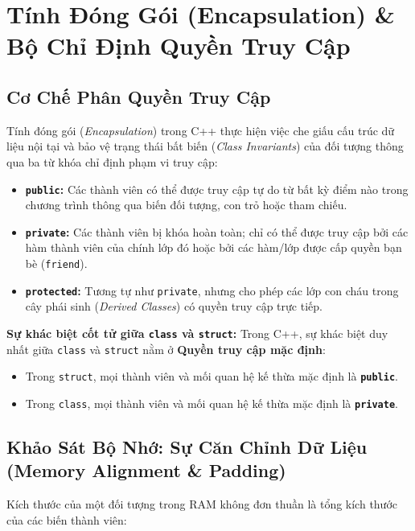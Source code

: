 \documentclass[12pt,a4paper,oneside]{book}
\begin{document}
\section{Tính Đóng Gói (Encapsulation) \& Bộ Chỉ Định Quyền Truy Cập}

\subsection{Cơ Chế Phân Quyền Truy Cập}

Tính đóng gói (\textit{Encapsulation}) trong C++ thực hiện việc che giấu cấu trúc dữ liệu nội tại và bảo vệ trạng thái bất biến (\textit{Class Invariants}) của đối tượng thông qua ba từ khóa chỉ định phạm vi truy cập:

\begin{itemize}
    \item \textbf{\texttt{public}:} Các thành viên có thể được truy cập tự do từ bất kỳ điểm nào trong chương trình thông qua biến đối tượng, con trỏ hoặc tham chiếu.
    \item \textbf{\texttt{private}:} Các thành viên bị khóa hoàn toàn; chỉ có thể được truy cập bởi các hàm thành viên của chính lớp đó hoặc bởi các hàm/lớp được cấp quyền bạn bè (\texttt{friend}).
    \item \textbf{\texttt{protected}:} Tương tự như \texttt{private}, nhưng cho phép các lớp con cháu trong cây phái sinh (\textit{Derived Classes}) có quyền truy cập trực tiếp.
\end{itemize}

\textbf{Sự khác biệt cốt tử giữa \texttt{class} và \texttt{struct}:}
Trong C++, sự khác biệt duy nhất giữa \texttt{class} và \texttt{struct} nằm ở \textbf{Quyền truy cập mặc định}:
\begin{itemize}
    \item Trong \texttt{struct}, mọi thành viên và mối quan hệ kế thừa mặc định là \textbf{\texttt{public}}.
    \item Trong \texttt{class}, mọi thành viên và mối quan hệ kế thừa mặc định là \textbf{\texttt{private}}.
\end{itemize}

\subsection{Khảo Sát Bộ Nhớ: Sự Căn Chỉnh Dữ Liệu (Memory Alignment \& Padding)}

Kích thước của một đối tượng trong RAM không đơn thuần là tổng kích thước của các biến thành viên:
\end{document}
